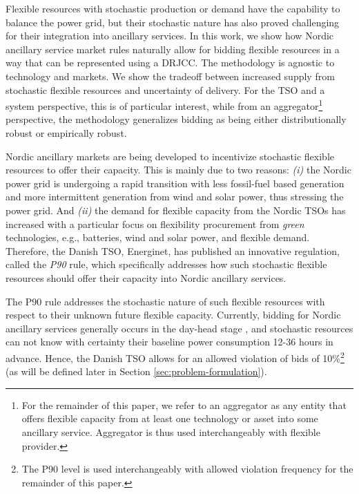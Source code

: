 \documentclass[conference]{IEEEtran}
\begin{document}
Flexible resources with stochastic production or demand have the capability to balance the power grid, but their stochastic nature has also proved challenging for their integration into ancillary services. In this work, we show how Nordic ancillary service market rules naturally allow for bidding flexible resources in a way that can be represented using a \ac{DRJCC}. The methodology is agnostic to technology and markets. We show the tradeoff between increased supply from stochastic flexible resources and uncertainty of delivery. For the \ac{TSO} and a system perspective, this is of particular interest, while from an aggregator\footnote{For the remainder of this paper, we refer to an aggregator as any entity that offers flexible capacity from at least one technology or asset into some ancillary service. Aggregator is thus used interchangeably with flexible provider.} perspective, the methodology generalizes bidding as being either distributionally robust or empirically robust.

Nordic ancillary markets are being developed to incentivize stochastic flexible resources to offer their capacity. This is mainly due to two reasons: \textit{(i)} the Nordic power grid is undergoing a rapid transition with less fossil-fuel based generation and more intermittent generation from wind and solar power, thus stressing the power grid. And \textit{(ii)} the demand for flexible capacity from the Nordic \acp{TSO} has increased with a particular focus on flexibility procurement from \textit{green} technologies, e.g., batteries, wind and solar power, and flexible demand. Therefore, the Danish \ac{TSO}, Energinet, has published an innovative regulation, called the \textit{P90} rule, which specifically addresses how such stochastic flexible resources should offer their capacity into Nordic ancillary services.

The P90 rule addresses the stochastic nature of such flexible resources with respect to their unknown future flexible capacity. Currently, bidding for Nordic ancillary services generally occurs in the day-head stage \cite{energinet}, and stochastic resources can not know with certainty their baseline power consumption 12-36 hours in advance. Hence, the Danish \ac{TSO} allows for an allowed violation of bids of 10\%\footnote{The P90 level is used interchangeably with allowed violation frequency for the remainder of this paper.} (as will be defined later in Section \ref{sec:problem-formulation}).
\end{document}
